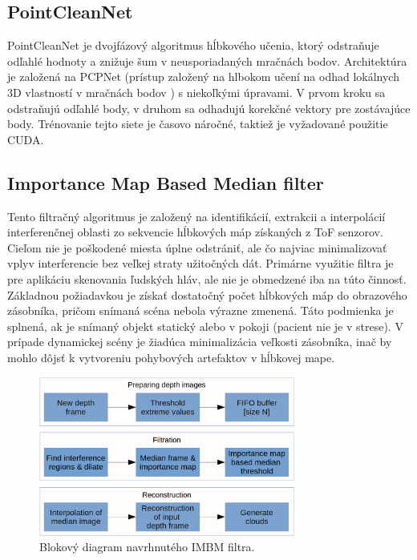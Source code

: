 \subsection{PointCleanNet}
PointCleanNet je dvojfázový algoritmus hĺbkového učenia, ktorý odstraňuje odľahlé hodnoty a znižuje šum v neusporiadaných mračnách bodov. Architektúra je založená na PCPNet (prístup založený na hlbokom učení na odhad lokálnych 3D vlastností v mračnách bodov \cite{Guitrero}) s niekoľkými úpravami. V prvom kroku sa odstraňujú odľahlé body, v druhom sa odhadujú korekčné vektory pre zostávajúce body. Trénovanie tejto siete je časovo náročné, taktiež je vyžadované použitie CUDA.

\subsection{Importance Map Based Median filter}

Tento filtračný algoritmus je založený na identifikácií, extrakcii a interpolácií interferenčnej oblasti zo sekvencie hĺbkových máp získaných z ToF senzorov. Cieľom nie je poškodené miesta úplne odstrániť, ale čo najviac minimalizovať vplyv interferencie bez veľkej straty užitočných dát. Primárne využitie filtra je pre aplikáciu skenovania ľudských hláv, ale nie je obmedzené iba na túto činnosť. Základnou požiadavkou je získať dostatočný počet hĺbkových máp do obrazového zásobníka, pričom snímaná scéna nebola výrazne zmenená. Táto podmienka je splnená, ak je snímaný objekt statický alebo v pokoji (pacient nie je v strese). V prípade dynamickej scény je žiadúca minimalizácia veľkosti zásobníka, inač by mohlo dôjsť k vytvoreniu pohybových artefaktov v hĺbkovej mape.

\begin{figure}[h]
	\centering
	\includegraphics[width=0.75\textwidth]{figures/algorithm.png}
	\caption{Blokový diagram navrhnutého IMBM filtra.}
	\label{fig:algorithm}
\end{figure}


